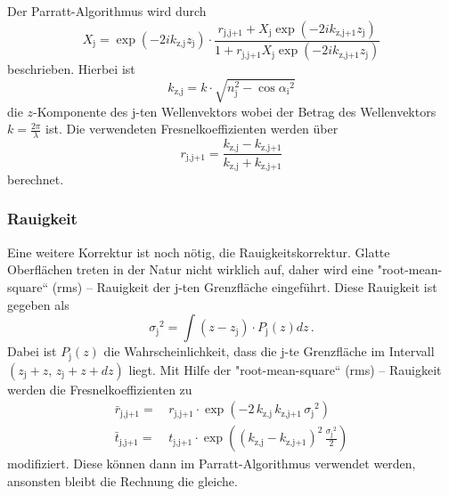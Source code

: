 Der Parratt-Algorithmus wird durch 
\begin{equation}
    X_\text{j} =  \exp(-2 i k_\text{z,j} z_\text{j}) \cdot  \frac{r_\text{j,j+1} + X_\text{j} \exp(-2 i k_\text{z,j+1} z_\text{j})}
    {1 + r_\text{j,j+1} X_\text{j} \exp(-2 i k_\text{z,j+1} z_\text{j})}
    \label{eq:parratt}
\end{equation}
beschrieben.
Hierbei ist 
\begin{equation}
    k_\text{z,j} = k \cdot \sqrt{n_\text{j}^2 -  {\cos{\alpha _\text{i}}}^2}
    \label{eq:k}
\end{equation}
die $z$-Komponente des j-ten Wellenvektors wobei der Betrag des Wellenvektors $k = \frac{2 \pi}{\lambda}$ ist.
Die verwendeten Fresnelkoeffizienten werden über 
\begin{equation}
    r_\text{j,j+1} = \frac{k_\text{z,j} - k_\text{z,j+1}}{k_\text{z,j} + k_\text{z,j+1}}
    \label{eq:r}
\end{equation}
berechnet.

\subsubsection{Rauigkeit}

Eine weitere Korrektur ist noch nötig, die Rauigkeitskorrektur. 
Glatte Oberflächen treten in der Natur nicht wirklich auf, daher wird eine "root-mean-square“ (rms) – Rauigkeit der j-ten Grenzfläche eingeführt.
Diese Rauigkeit ist gegeben als 
\begin{equation}
    {\sigma _\text{j}}^2 = \int \left( z - z_\text{j} \right) \cdot P_\text{j}(z) dz  \,.
    \label{eq:rms}
\end{equation}
Dabei ist $P_\text{j}(z)$ die Wahrscheinlichkeit, dass die j-te Grenzfläche im Intervall $\left(z_\text{j} + z,\, z_\text{j} + z + dz  \right) $ liegt.
Mit Hilfe der "root-mean-square“ (rms) – Rauigkeit werden die Fresnelkoeffizienten zu 
\begin{align}
    \bar{r} _\text{j,j+1} =& \, r_\text{j,j+1} \cdot \exp\left(  - 2 \, k_\text{z,j} \,  k_\text{z,j+1} \, {\sigma _\text{j}}^2  \right) 
    \label{eq:r_modifiziert} \\
    \bar{t} _\text{j,j+1} =& \, t_\text{j,j+1} \cdot \exp\left(  (k_\text{z,j} - k_\text{z,j+1})^2 \, \frac{{\sigma _\text{j}}^2}{2}  \right)
    \label{eq:t_modifiziert}
\end{align}
modifiziert.
Diese können dann im Parratt-Algorithmus verwendet werden, ansonsten bleibt die Rechnung die gleiche.

